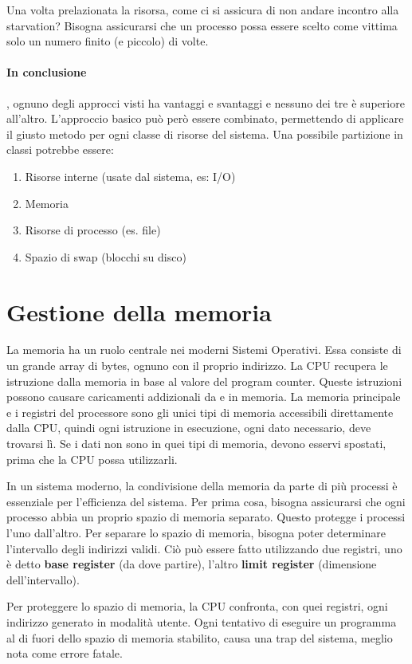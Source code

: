 \documentclass[a4paper]{article}
\begin{document}
Una volta prelazionata la risorsa, come ci si assicura di non andare incontro alla starvation? Bisogna assicurarsi che un processo possa essere scelto come vittima solo un numero finito (e piccolo) di volte.

\paragraph{In conclusione}, ognuno degli approcci visti ha vantaggi e svantaggi e nessuno dei tre è superiore all'altro. L'approccio basico può però essere combinato, permettendo di applicare il giusto metodo per ogni classe di risorse del sistema. Una possibile partizione in classi potrebbe essere:
\begin{enumerate}
    \item Risorse interne (usate dal sistema, es: I/O)
    \item Memoria
    \item Risorse di processo (es. file)
    \item Spazio di swap (blocchi su disco)
\end{enumerate}

\section{Gestione della memoria}
La memoria ha un ruolo centrale nei moderni Sistemi Operativi. Essa consiste di un grande array di bytes, ognuno con il proprio indirizzo. La CPU recupera le istruzione dalla memoria in base al valore del program counter. Queste istruzioni possono causare caricamenti addizionali da e in memoria. La memoria principale e i registri del processore sono gli unici tipi di memoria accessibili direttamente dalla CPU, quindi ogni istruzione in esecuzione, ogni dato necessario, deve trovarsi lì. Se i dati non sono in quei tipi di memoria, devono esservi spostati, prima che la CPU possa utilizzarli.

In un sistema moderno, la condivisione della memoria da parte di più processi è essenziale per l'efficienza del sistema. Per prima cosa, bisogna assicurarsi che ogni processo abbia un proprio spazio di memoria separato. Questo protegge i processi l'uno dall'altro. Per separare lo spazio di memoria, bisogna poter determinare l'intervallo degli indirizzi validi. Ciò può essere fatto utilizzando due registri, uno è detto \textbf{base register} (da dove partire), l'altro \textbf{limit register} (dimensione dell'intervallo).

Per proteggere lo spazio di memoria, la CPU confronta, con quei registri, ogni indirizzo generato in modalità utente. Ogni tentativo di eseguire un programma al di fuori dello spazio di memoria stabilito, causa una trap del sistema, meglio nota come errore fatale.
\end{document}
